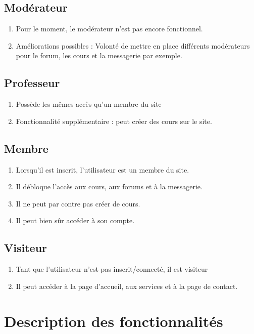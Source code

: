 \documentclass[12pt,a4paper]{article}
\begin{document}
\subsection{Modérateur}
\begin{enumerate}
    \item Pour le moment, le modérateur n'est pas encore fonctionnel.
    \item Améliorations possibles : Volonté de mettre en place différents modérateurs pour le forum, les cours et la messagerie par exemple.
\end{enumerate}
\subsection{Professeur}
\begin{enumerate}
    \item Possède les mêmes accès qu'un membre du site
    \item Fonctionnalité supplémentaire : peut créer des cours sur le site.
\end{enumerate}
\subsection{Membre}
\begin{enumerate}
    \item Lorsqu'il est inscrit, l'utilisateur est un membre du site.
    \item Il débloque l'accès aux cours, aux forums et à la messagerie.
    \item Il ne peut par contre pas créer de cours.
    \item Il peut bien sûr accéder à son compte.
\end{enumerate}
\subsection{Visiteur}
\begin{enumerate}
    \item Tant que l'utilisateur n'est pas inscrit/connecté, il est visiteur
    \item Il peut accéder à la page d'accueil, aux services et à la page de contact.
\end{enumerate}

\section{Description des fonctionnalités}
\end{document}
